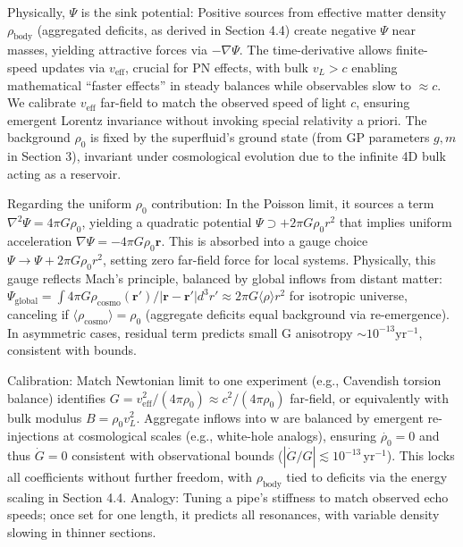 \documentclass{article}
\begin{document}
Physically, $\Psi$ is the sink potential: Positive sources from effective matter density $\rho_{\text{body}}$ (aggregated deficits, as derived in Section 4.4) create negative $\Psi$ near masses, yielding attractive forces via $-\nabla \Psi$. The time-derivative allows finite-speed updates via $v_{\text{eff}}$, crucial for PN effects, with bulk $v_L > c$ enabling mathematical ``faster effects'' in steady balances while observables slow to $\approx c$. We calibrate $v_{\text{eff}}$ far-field to match the observed speed of light $c$, ensuring emergent Lorentz invariance without invoking special relativity a priori. The background $\rho_0$ is fixed by the superfluid's ground state (from GP parameters $g, m$ in Section 3), invariant under cosmological evolution due to the infinite 4D bulk acting as a reservoir.

Regarding the uniform $\rho_0$ contribution: In the Poisson limit, it sources a term $\nabla^2 \Psi = 4\pi G \rho_0$, yielding a quadratic potential $\Psi \supset +2\pi G \rho_0 r^2$ that implies uniform acceleration $\nabla \Psi = -4\pi G \rho_0 \mathbf{r}$. This is absorbed into a gauge choice $\Psi \to \Psi + 2\pi G \rho_0 r^2$, setting zero far-field force for local systems. Physically, this gauge reflects Mach's principle, balanced by global inflows from distant matter: $\Psi_{\text{global}} = \int 4\pi G \rho_{\text{cosmo}}(\mathbf{r}') / |\mathbf{r} - \mathbf{r}'| d^3 r' \approx 2\pi G \langle \rho \rangle r^2$ for isotropic universe, canceling if $\langle \rho_{\text{cosmo}} \rangle = \rho_0$ (aggregate deficits equal background via re-emergence). In asymmetric cases, residual term predicts small G anisotropy $\sim 10^{-13} \mathrm{yr}^{-1}$, consistent with bounds.

Calibration: Match Newtonian limit to one experiment (e.g., Cavendish torsion balance) identifies $G = v_{\text{eff}}^2 / (4\pi \rho_0) \approx c^2 / (4\pi \rho_0)$ far-field, or equivalently with bulk modulus $B = \rho_0 v_L^2$. Aggregate inflows into w are balanced by emergent re-injections at cosmological scales (e.g., white-hole analogs), ensuring $\dot{\rho_0} = 0$ and thus $\dot{G} = 0$ consistent with observational bounds ($ |\dot{G}/G| \lesssim 10^{-13} \, \mathrm{yr}^{-1} $). This locks all coefficients without further freedom, with $\rho_{\text{body}}$ tied to deficits via the energy scaling in Section 4.4. Analogy: Tuning a pipe's stiffness to match observed echo speeds; once set for one length, it predicts all resonances, with variable density slowing in thinner sections.
\end{document}
